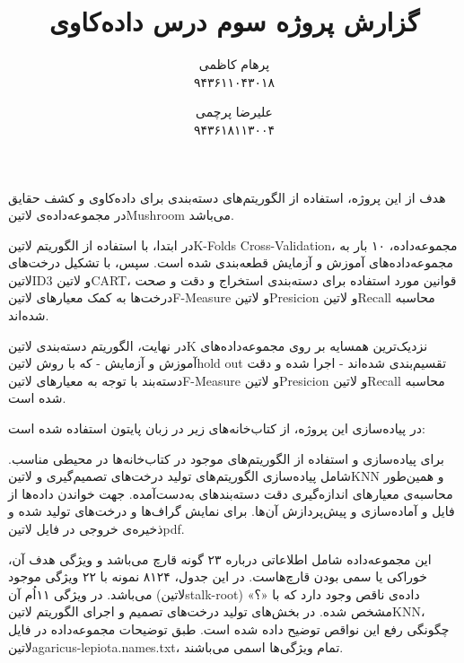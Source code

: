 \documentclass[a4paper,12pt]{article}
\title{گزارش پروژه سوم درس داده‌کاوی}
\author{
پرهام کاظمی \\ ۹۴۳۶۱۱۰۴۳۰۱۸
\and
علیرضا پرچمی \\ ۹۴۳۶۱۸۱۱۳۰۰۴
}
\begin{document}
	\maketitle
	

هدف از این پروژه، استفاده از الگوریتم‌های دسته‌بندی  برای داده‌کاوی و کشف حقایق در مجموعه‌داده‌ی ‌لاتین{Mushroom} می‌باشد.

در ابتدا، با استفاده از الگوریتم ‌لاتین{K-Folds Cross-Validation}، مجموعه‌داده، ۱۰ بار به مجموعه‌داده‌های آموزش و آزمایش قطعه‌بندی شده است. سپس، با تشکیل درخت‌های ‌لاتین{ID3} و ‌لاتین{CART}، قوانین مورد استفاده برای دسته‌بندی استخراج و دقت و صحت درخت‌ها به کمک معیارهای ‌لاتین{F-Measure} و ‌لاتین{Presicion} و ‌لاتین{Recall} محاسبه شده‌اند. 

در نهایت، الگوریتم دسته‌بندی ‌لاتین{K} نزدیک‌ترین همسایه  بر روی مجموعه‌داده‌های آموزش و آزمایش - که با روش ‌لاتین{hold out} تقسیم‌بندی شده‌اند - اجرا شده و دقت دسته‌بند با توجه به معیارهای  ‌لاتین{F-Measure} و ‌لاتین{Presicion} و ‌لاتین{Recall} محاسبه شده‌ است.
	
	
	در پیاده‌سازی این پروژه، از کتاب‌خانه‌های زیر در زبان پایتون استفاده شده است:
	
		  برای پیاده‌سازی و استفاده از الگوریتم‌های موجود در کتاب‌خانه‌ها در محیطی مناسب.
		 شامل پیاده‌سازی الگوریتم‌های تولید درخت‌های تصمیم‌گیری و ‌لاتین{KNN} و همین‌طور محاسبه‌ی معیارهای اندازه‌گیری دقت دسته‌بندهای به‌دست‌آمده.
		 جهت خواندن داده‌ها از فایل و آماده‌سازی و پیش‌پردازش آن‌ها.
		 برای نمایش گراف‌ها و درخت‌های تولید شده و ذخیره‌ی خروجی در فایل ‌لاتین{pdf}.
	
	
	این مجموعه‌داده شامل اطلاعاتی درباره ۲۳ گونه قارچ می‌باشد و ویژگی هدف آن، خوراکی یا سمی بودن قارچ‌هاست. در این جدول، ۸۱۲۴ نمونه با ۲۲ ویژگی موجود می‌باشد. در ویژگی ۱۱اُم آن (‌لاتین{stalk-root}) داده‌ی ناقص وجود دارد که با «؟» مشخص شده. در بخش‌های تولید درخت‌های تصمیم و اجرای الگوریتم ‌لاتین{KNN}، چگونگی رفع این نواقص توضیح داده شده است. طبق توضیحات مجموعه‌داده در فایل ‌لاتین{agaricus-lepiota.names.txt}، تمام ویژگی‌ها اسمی می‌باشند.
	
	
\end{document}
